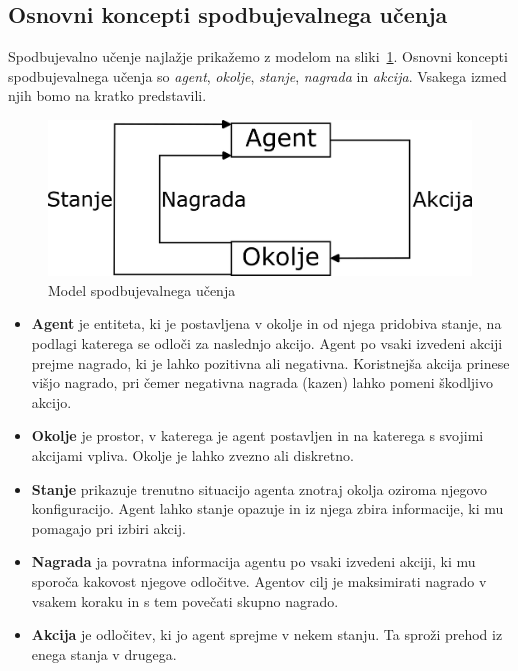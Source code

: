 \documentclass[cover]{thesis}
\begin{document}
\subsection{Osnovni koncepti spodbujevalnega učenja}

Spodbujevalno učenje najlažje prikažemo z modelom na sliki~\ref{fig:rlmodel}. Osnovni koncepti spodbujevalnega učenja so \emph{agent}, \emph{okolje}, \emph{stanje}, \emph{nagrada} in \emph{akcija}. Vsakega izmed njih bomo na kratko predstavili.

\begin{figure}[H]
    \includegraphics{RLmodel.png}
    \caption{Model spodbujevalnega učenja}\label{fig:rlmodel}
\end{figure}

\begin{itemize}
    \item \textbf{Agent} je entiteta, ki je postavljena v okolje in od njega pridobiva stanje, na podlagi katerega se odloči za naslednjo akcijo. Agent po vsaki izvedeni akciji prejme nagrado, ki je lahko pozitivna ali negativna. Koristnejša akcija prinese višjo nagrado, pri čemer negativna nagrada (kazen) lahko pomeni škodljivo akcijo.
    \item \textbf{Okolje} je prostor, v katerega je agent postavljen in na katerega s svojimi akcijami vpliva. Okolje je lahko zvezno ali diskretno.
    \item \textbf{Stanje} prikazuje trenutno situacijo agenta znotraj okolja oziroma njegovo konfiguracijo. Agent lahko stanje opazuje in iz njega zbira informacije, ki mu pomagajo pri izbiri akcij.
    \item \textbf{Nagrada} ja povratna informacija agentu po vsaki izvedeni akciji, ki mu sporoča kakovost njegove odločitve. Agentov cilj je maksimirati nagrado v vsakem koraku in s tem povečati skupno nagrado.
    \item \textbf{Akcija} je odločitev, ki jo agent sprejme v nekem stanju. Ta sproži prehod iz enega stanja v drugega.
\end{itemize}
\end{document}
